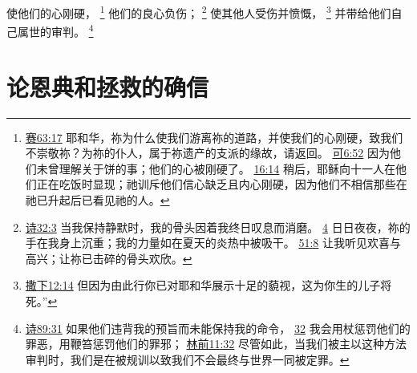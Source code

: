 \documentclass[12pt, a4paper, oneside]{ctexart}
\begin{document}
	使他们的心刚硬，
	\footnote {
		\href{https://biblehub.com/isaiah/63-17.htm}{赛63:17} 耶和华，祢为什么使我们游离祢的道路，并使我们的心刚硬，致我们不崇敬祢？为祢的仆人，属于祢遗产的支派的缘故，请返回。
		\href{https://biblehub.com/mark/6-52.htm}{可6:52} 因为他们未曾理解关于饼的事；他们的心被刚硬了。
		\href{https://biblehub.com/mark/16-14.htm}{16:14} 稍后，耶稣向十一人在他们正在吃饭时显现；祂训斥他们信心缺乏且内心刚硬，因为他们不相信那些在祂已升起后已看见祂的人。
	}
	他们的良心负伤；
	\footnote {
		\href{https://biblehub.com/psalms/32-3.htm}{诗32:3} 当我保持静默时，我的骨头因着我终日叹息而消磨。
		\href{https://biblehub.com/psalms/32-4.htm}{4} 日日夜夜，祢的手在我身上沉重；我的力量如在夏天的炎热中被吸干。
		\href{https://biblehub.com/psalms/51-8.htm}{51:8} 让我听见欢喜与高兴；让祢已击碎的骨头欢欣。
	}
	使其他人受伤并愤慨，
	\footnote {
		\href{https://biblehub.com/2_samuel/12-14.htm}{撒下12:14} 但因为由此行你已对耶和华展示十足的藐视，这为你生的儿子将死。”
	}
	并带给他们自己属世的审判。
	\footnote {
		\href{https://biblehub.com/psalms/89-31.htm}{诗89:31} 如果他们违背我的预旨而未能保持我的命令，
		\href{https://biblehub.com/psalms/89-32.htm}{32} 我会用杖惩罚他们的罪恶，用鞭笞惩罚他们的罪邪；
		\href{https://biblehub.com/1_corinthians/11-32.htm}{林前11:32} 尽管如此，当我们被主以这种方法审判时，我们是在被规训以致我们不会最终与世界一同被定罪。
	}

\section{论恩典和拯救的确信}
\end{document}
